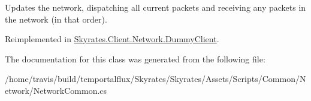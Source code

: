 Updates the network, dispatching all current packets and receiving any packets in the network (in that order). 



Reimplemented in \hyperlink{class_skyrates_1_1_client_1_1_network_1_1_dummy_client_a293ecc1918e24e8da6002a2491277333}{Skyrates.\-Client.\-Network.\-Dummy\-Client}.



The documentation for this class was generated from the following file\-:\begin{DoxyCompactItemize}
\item 
/home/travis/build/temportalflux/\-Skyrates/\-Skyrates/\-Assets/\-Scripts/\-Common/\-Network/Network\-Common.\-cs\end{DoxyCompactItemize}
